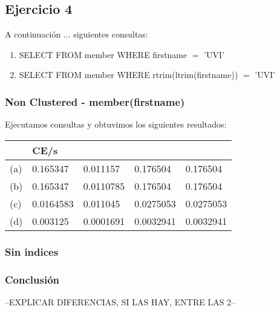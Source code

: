 \subsection{Ejercicio 4}

A continuación ... siguientes consultas:
\begin{enumerate}[label=(\alph*)]
\item{SELECT \* FROM member WHERE firstname $=$ 'UVI'}

\item{SELECT \* FROM member WHERE rtrim(ltrim(firstname)) $=$ 'UVI'}

\end{enumerate}

\subsubsection{Non Clustered - member(firstname)}

Ejecutamos consultas y obtuvimos los siguientes resultados:

\begin{tabular}{| L | L | L | L | L |}
    \hline
     & CE/s &  &  &  \\ \hline
    (a) & 0.165347 & 0.011157 & 0.176504 & 0.176504 \\ \hline
    (b) & 0.165347 & 0.0110785 & 0.176504 & 0.176504 \\ \hline
    (c) & 0.0164583 & 0.011045 & 0.0275053 & 0.0275053 \\ \hline
    (d) & 0.003125 & 0.0001691 & 0.0032941 & 0.0032941 \\ \hline    
\end{tabular}
	
\subsubsection{Sin indices}
			
		
			
			


\subsubsection{Conclusión}

--EXPLICAR DIFERENCIAS, SI LAS HAY, ENTRE LAS 2--